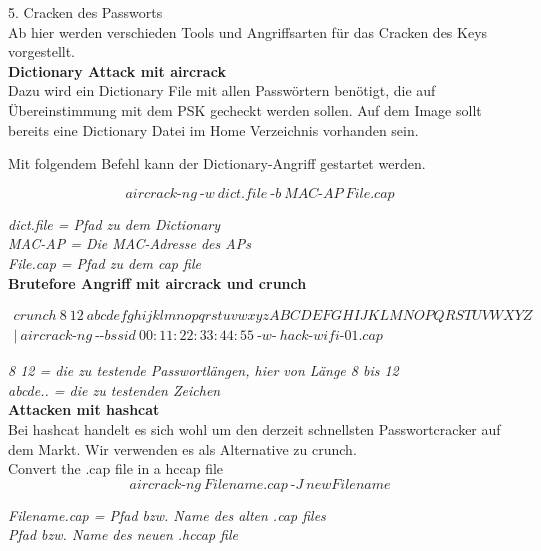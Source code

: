 {\Large 5. Cracken des Passworts}\\
		
Ab hier werden verschieden Tools und Angriffsarten für das Cracken des Keys vorgestellt.\\	

 \textbf{Dictionary Attack mit aircrack}\\

Dazu wird ein Dictionary File mit allen Passwörtern benötigt, die auf Übereinstimmung mit dem PSK gecheckt werden sollen. Auf dem Image sollt bereits eine Dictionary Datei im Home Verzeichnis vorhanden sein.

Mit folgendem Befehl kann der Dictionary-Angriff gestartet werden. 

$$aircrack\text{-}ng~\text{-}w~dict.file~\text{-}b~MAC\text{-}AP~File.cap$$

\textit{dict.file = Pfad zu dem Dictionary}\\ 
\textit{MAC-AP = Die MAC-Adresse des APs}\\ 
\textit{File.cap = Pfad zu dem cap file}\\

\textbf{Brutefore Angriff mit aircrack und crunch}

\begin{equation*}
\begin{split}
crunch~8~12~abcdefghijklmnopqrstuvwxyzABCDEFGHIJKLMNOPQRSTUVWXYZ \\
|~aircrack\text{-}ng~\text{-}\text{-}bssid~00:11:22:33:44:55~\text{-}w\text{-}~hack\text{-}wifi\text{-}01.cap
\end{split}
\end{equation*}
 
\textit{8 12 = die zu testende Passwortlängen, hier von Länge 8 bis 12}\\
\textit{abcde.. = die zu testenden Zeichen}\\



\textbf{Attacken mit hashcat}\\

Bei hashcat handelt es sich wohl um den derzeit schnellsten Passwortcracker auf dem Markt. Wir verwenden es als Alternative zu crunch.\\

Convert the .cap file in a hccap file\\

$$aircrack\text{-}ng~Filename.cap~\text{-}J~newFilename$$

\textit{Filename.cap = Pfad bzw. Name des alten .cap files}\\
\textit{Pfad bzw. Name des neuen .hccap file}\\

